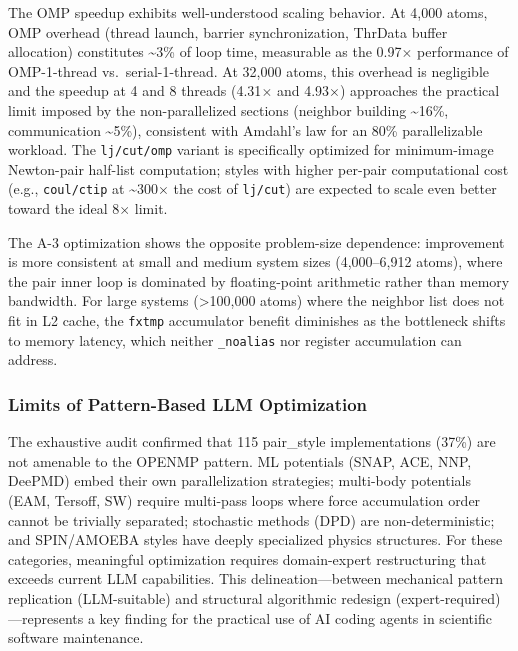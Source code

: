 \documentclass[
  11pt,
]{article}
\begin{document}
The OMP speedup exhibits well-understood scaling behavior. At 4,000
atoms, OMP overhead (thread launch, barrier synchronization, ThrData
buffer allocation) constitutes \textasciitilde3\% of loop time,
measurable as the 0.97\(\times\) performance of OMP-1-thread
vs.~serial-1-thread. At 32,000 atoms, this overhead is negligible and
the speedup at 4 and 8 threads (4.31\(\times\) and 4.93\(\times\))
approaches the practical limit imposed by the non-parallelized sections
(neighbor building \textasciitilde16\%, communication
\textasciitilde5\%), consistent with Amdahl's law for an 80\%
parallelizable workload. The \texttt{lj/cut/omp} variant is specifically
optimized for minimum-image Newton-pair half-list computation; styles
with higher per-pair computational cost (e.g., \texttt{coul/ctip} at
\textasciitilde300\(\times\) the cost of \texttt{lj/cut}) are expected
to scale even better toward the ideal 8\(\times\) limit.

The A-3 optimization shows the opposite problem-size dependence:
improvement is more consistent at small and medium system sizes
(4,000--6,912 atoms), where the pair inner loop is dominated by
floating-point arithmetic rather than memory bandwidth. For large
systems (\textgreater100,000 atoms) where the neighbor list does not fit
in L2 cache, the \texttt{fxtmp} accumulator benefit diminishes as the
bottleneck shifts to memory latency, which neither \texttt{\_noalias}
nor register accumulation can address.

\subsubsection{Limits of Pattern-Based LLM
Optimization}\label{limits-of-pattern-based-llm-optimization}

The exhaustive audit confirmed that 115 pair\_style implementations
(37\%) are not amenable to the OPENMP pattern. ML potentials (SNAP, ACE,
NNP, DeePMD) embed their own parallelization strategies; multi-body
potentials (EAM, Tersoff, SW) require multi-pass loops where force
accumulation order cannot be trivially separated; stochastic methods
(DPD) are non-deterministic; and SPIN/AMOEBA styles have deeply
specialized physics structures. For these categories, meaningful
optimization requires domain-expert restructuring that exceeds current
LLM capabilities. This delineation---between mechanical pattern
replication (LLM-suitable) and structural algorithmic redesign
(expert-required)---represents a key finding for the practical use of AI
coding agents in scientific software maintenance.
\end{document}
